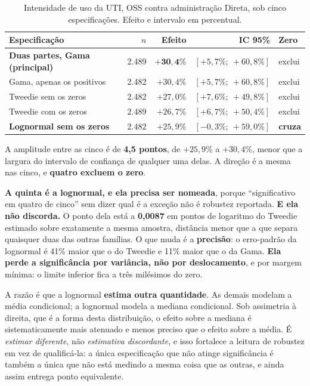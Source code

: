 \begin{table}[H]
\centering
\caption{Intensidade de uso da UTI, OSS contra administração Direta, sob
cinco especificações. Efeito e intervalo em percentual.}
\label{tab:familiasuti}
\small
\begin{tabular}{lrrrl}
\toprule
Especificação & $n$ & Efeito & IC 95\% & Zero \\
\midrule
\textbf{Duas partes, Gama (principal)} & 2.489 & $\mathbf{+30{,}4\%}$ & $[+5{,}7\%;\ +60{,}8\%]$ & exclui \\
Gama, apenas os positivos              & 2.482 & $+30{,}4\%$ & $[+5{,}7\%;\ +60{,}8\%]$ & exclui \\
Tweedie sem os zeros                   & 2.482 & $+27{,}0\%$ & $[+7{,}6\%;\ +49{,}8\%]$ & exclui \\
Tweedie com os zeros                   & 2.489 & $+26{,}7\%$ & $[+6{,}7\%;\ +50{,}4\%]$ & exclui \\
\textbf{Lognormal sem os zeros}        & 2.482 & $+25{,}9\%$ & $[-0{,}3\%;\ +59{,}0\%]$ & \textbf{cruza} \\
\bottomrule
\end{tabular}
\end{table}

A amplitude entre as cinco é de \textbf{4,5 pontos}, de $+25{,}9\%$ a
$+30{,}4\%$, menor que a
largura do intervalo de confiança de qualquer uma delas. A direção é a mesma
nas cinco, e \textbf{quatro excluem o zero}.

\textbf{A quinta é a lognormal, e ela precisa ser nomeada}, porque
``significativo em quatro de cinco'' sem dizer qual é a exceção não é
robustez reportada. \textbf{E ela não discorda.} O ponto dela está a
\textbf{0,0087} em pontos de logaritmo do Tweedie estimado sobre exatamente
a mesma amostra, distância menor que a que separa quaisquer duas das
outras famílias. O que muda é a \textbf{precisão}: o erro-padrão da
lognormal é 41\% maior que o do Tweedie e 11\% maior que o da Gama.
\textbf{Ela perde a significância por variância, não por deslocamento}, e
por margem mínima: o limite inferior fica a três milésimos do zero.

A razão é que a lognormal \textbf{estima outra quantidade}. As demais
modelam a média condicional; a lognormal modela a mediana condicional. Sob
assimetria à direita, que é a forma desta distribuição, o efeito sobre a
mediana é sistematicamente mais atenuado e menos preciso que o efeito sobre
a média. É \emph{estimar diferente}, não \emph{estimativa discordante}, e
isso fortalece a leitura de robustez em vez de qualificá-la: a única
especificação que não atinge significância é também a única que não está
medindo a mesma coisa que as outras, e ainda assim entrega ponto
equivalente.

